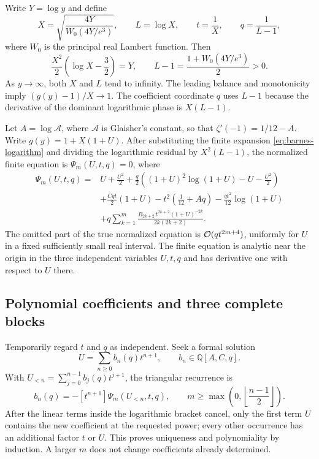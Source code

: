 Write $Y=\log y$ and define
\begin{equation}
 X=\sqrt{\frac{4Y}{W_0(4Y/e^3)}},\qquad
 L=\log X,\qquad t=\frac1X,\qquad q=\frac1{L-1},
 \label{eq:barnes-inverse-coordinate}
\end{equation}
where $W_0$ is the principal real Lambert function. Then
\begin{equation}
 \frac{X^2}{2}\left(\log X-\frac32\right)=Y,
 \qquad
 L-1=\frac{1+W_0(4Y/e^3)}2>0.
 \label{eq:barnes-inverse-balance}
\end{equation}
As $y\to\infty$, both $X$ and $L$ tend to infinity. The leading
balance and monotonicity imply $(g(y)-1)/X\to1$.
The coefficient coordinate $q$ uses $L-1$ because the derivative
of the dominant logarithmic phase is $X(L-1)$.

Let $A=\log\mathcal A$, where $\mathcal A$ is Glaisher's constant,
so that $\zeta'(-1)=1/12-A$. Write
$g(y)=1+X(1+U)$. After substituting the finite expansion
\eqref{eq:barnes-logarithm} and dividing the logarithmic residual
by $X^2(L-1)$, the normalized finite equation is
$\Psi_m(U,t,q)=0$, where
\begin{equation}
\begin{aligned}
 \Psi_m(U,t,q)={}&U+\frac{U^2}{2}
   +\frac q2\left((1+U)^2\log(1+U)-U-\frac{U^2}{2}\right)\\
 &+\frac{Cqt}{2}(1+U)-t^2\left(\frac1{12}+Aq\right)
   -\frac{qt^2}{12}\log(1+U)\\
 &+q\sum_{k=1}^{m}
   \frac{B_{2k+2}\,t^{2k+2}(1+U)^{-2k}}{2k(2k+2)}.
\end{aligned}
 \label{eq:barnes-inverse-normalized-equation}
\end{equation}
The omitted part of the true normalized equation is
$\mathcal O(qt^{2m+4})$, uniformly for $U$ in a fixed sufficiently small
real interval. The finite equation is analytic near the origin in
the three independent variables $U,t,q$ and has derivative one
with respect to $U$ there.

\subsection{Polynomial coefficients and three complete blocks}

Temporarily regard $t$ and $q$ as independent. Seek a formal solution
\begin{equation}
 U=\sum_{n\ge0}b_n(q)t^{n+1},\qquad
 b_n\in\mathbb Q[A,C,q].
 \label{eq:barnes-inverse-unit-series}
\end{equation}
With $U_{<n}=\sum_{j=0}^{n-1}b_j(q)t^{j+1}$, the triangular recurrence is
\begin{equation}
 b_n(q)=-[t^{n+1}]\Psi_m(U_{<n},t,q),\qquad
 m\ge\max\left(0,\left\lfloor\frac{n-1}{2}\right\rfloor\right).
 \label{eq:barnes-inverse-coefficient-recurrence}
\end{equation}
After the linear terms inside the logarithmic bracket cancel,
only the first term $U$ contains the new coefficient at the requested
power; every other occurrence has an additional factor $t$ or $U$.
This proves uniqueness and polynomiality by induction. A larger $m$
does not change coefficients already determined.

